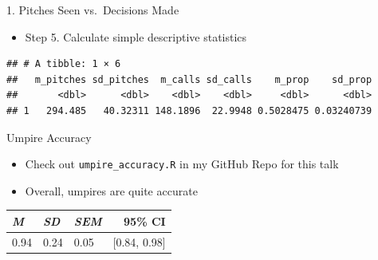\begin{frame}[fragile]{1. Pitches Seen vs.~Decisions Made}

\begin{itemize}
\tightlist
\item
  Step 5. Calculate simple descriptive statistics
\end{itemize}

\footnotesize

\begin{Shaded}
\end{Shaded}

\begin{verbatim}
## # A tibble: 1 × 6
##   m_pitches sd_pitches  m_calls sd_calls    m_prop    sd_prop
##       <dbl>      <dbl>    <dbl>    <dbl>     <dbl>      <dbl>
## 1   294.485   40.32311 148.1896  22.9948 0.5028475 0.03240739
\end{verbatim}

\end{frame}

\begin{frame}[fragile]{Umpire Accuracy}

\begin{itemize}
\tightlist
\item
  Check out \texttt{umpire\_accuracy.R} in my GitHub Repo for this talk
\item
  Overall, umpires are quite accurate
\end{itemize}

\begin{table}[ht]
\centering
\begin{tabular}{lllr}
\hline
\em{M} & \em{SD} & \em{SEM} & 95\% CI \\
\hline
0.94 & 0.24 & 0.05 & [0.84, 0.98] \\
\hline
\end{tabular}
\end{table}

\end{frame}

